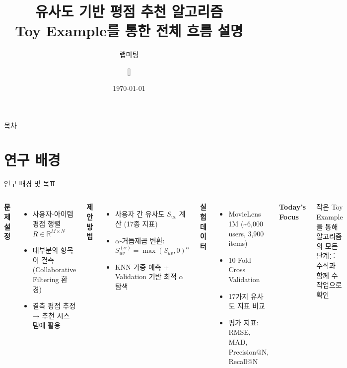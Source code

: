 \documentclass[aspectratio=169, 10pt]{beamer}
\title[Similarity-Based Imputation]{유사도 기반 평점 추천 알고리즘\\
       \small Toy Example를 통한 전체 흐름 설명}
\subtitle{랩미팅}
\author[발표자]{[]}
\institute{[]}
\date{\today}
\begin{document}

\begin{frame}
  \titlepage
\end{frame}

\begin{frame}{목차}
  \tableofcontents[hideallsubsections]
\end{frame}

\section{연구 배경}

\begin{frame}{연구 배경 및 목표}
  \begin{columns}[T]
      \textbf{문제 설정}
      \begin{itemize}
        \item 사용자-아이템 평점 행렬 $R \in \mathbb{R}^{M \times N}$
        \item 대부분의 항목이 결측 (Collaborative Filtering 환경)
        \item 결측 평점 추정 → 추천 시스템에 활용
      \end{itemize}
      \vspace{0.6em}
      \textbf{제안 방법}
      \begin{itemize}
        \item 사용자 간 유사도 $S_{uv}$ 계산 (17종 지표)
        \item $\alpha$-거듭제곱 변환:\; $S_{uv}^{(\alpha)} = \max(S_{uv}, 0)^{\alpha}$
        \item KNN 가중 예측 + Validation 기반 최적 $\alpha$ 탐색
      \end{itemize}

      \textbf{실험 데이터}
      \begin{itemize}
        \item MovieLens 1M (\textasciitilde 6,000 users, 3,900 items)
        \item 10-Fold Cross Validation
        \item 17가지 유사도 지표 비교
        \item 평가 지표: RMSE, MAD, Precision@N, Recall@N
      \end{itemize}
      \vspace{0.6em}
      \textbf{Today's Focus}
      \begin{alertblock}{}
        작은 Toy Example을 통해 알고리즘의 모든 단계를
        수식과 함께 수작업으로 확인
      \end{alertblock}
  \end{columns}
\end{frame}
\end{document}
